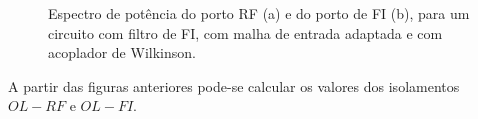 \documentclass[11pt]{article}
\numberwithin{equation}{section}
\begin{document}
\begin{figure}[h]
	\centering
	\hspace{8mm}
	\vspace{-0.8em}
	\caption{Espectro de potência do porto RF (a) e do porto de FI (b), para um circuito com filtro de FI, com malha de entrada adaptada e com acoplador de Wilkinson.}
	\vspace{-0.8em}
\end{figure}

A partir das figuras anteriores pode-se calcular os valores dos isolamentos $OL - RF$ e $OL - FI$. 
\end{document}
